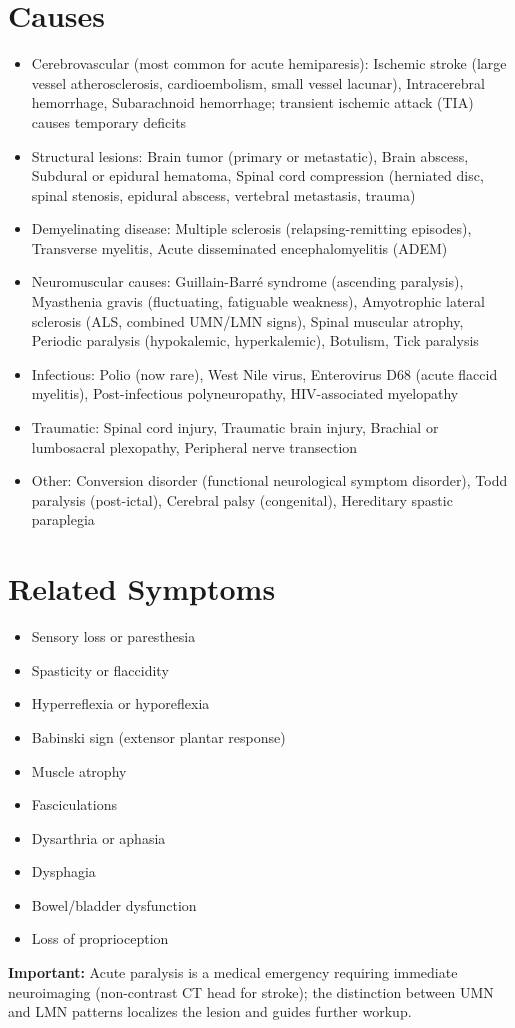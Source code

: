 \section*{Causes}
\begin{itemize}
  \item Cerebrovascular (most common for acute hemiparesis): Ischemic stroke (large vessel atherosclerosis, cardioembolism, small vessel lacunar), Intracerebral hemorrhage, Subarachnoid hemorrhage; transient ischemic attack (TIA) causes temporary deficits
  \item Structural lesions: Brain tumor (primary or metastatic), Brain abscess, Subdural or epidural hematoma, Spinal cord compression (herniated disc, spinal stenosis, epidural abscess, vertebral metastasis, trauma)
  \item Demyelinating disease: Multiple sclerosis (relapsing-remitting episodes), Transverse myelitis, Acute disseminated encephalomyelitis (ADEM)
  \item Neuromuscular causes: Guillain-Barr\'e syndrome (ascending paralysis), Myasthenia gravis (fluctuating, fatiguable weakness), Amyotrophic lateral sclerosis (ALS, combined UMN/LMN signs), Spinal muscular atrophy, Periodic paralysis (hypokalemic, hyperkalemic), Botulism, Tick paralysis
  \item Infectious: Polio (now rare), West Nile virus, Enterovirus D68 (acute flaccid myelitis), Post-infectious polyneuropathy, HIV-associated myelopathy
  \item Traumatic: Spinal cord injury, Traumatic brain injury, Brachial or lumbosacral plexopathy, Peripheral nerve transection
  \item Other: Conversion disorder (functional neurological symptom disorder), Todd paralysis (post-ictal), Cerebral palsy (congenital), Hereditary spastic paraplegia
\end{itemize}

\section*{Related Symptoms}
\begin{itemize}
  \item Sensory loss or paresthesia
  \item Spasticity or flaccidity
  \item Hyperreflexia or hyporeflexia
  \item Babinski sign (extensor plantar response)
  \item Muscle atrophy
  \item Fasciculations
  \item Dysarthria or aphasia
  \item Dysphagia
  \item Bowel/bladder dysfunction
  \item Loss of proprioception
\end{itemize}
\textbf{Important:} Acute paralysis is a medical emergency requiring immediate neuroimaging (non-contrast CT head for stroke); the distinction between UMN and LMN patterns localizes the lesion and guides further workup.

